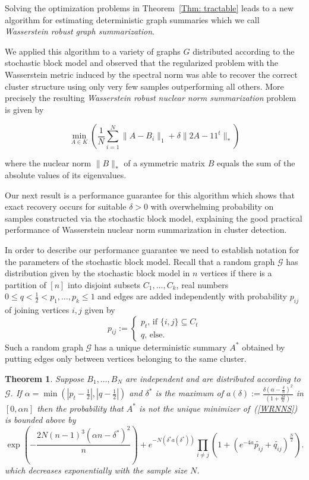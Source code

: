 \documentclass[12pt]{amsart}
\newtheorem{theorem}[lemma]{Theorem}
\theoremstyle{remark}
\newcommand{\grG}{{\mathcal{G}}}
\begin{document}
Solving the optimization problems in Theorem~\ref{Thm: tractable} leads to a new algorithm for estimating deterministic graph summaries which we call {\it Wasserstein robust graph summarization}. 

We applied this algorithm to a variety of graphs $G$ distributed according to the stochastic block model and observed that the regularized problem with the Wasserstein metric induced by the spectral norm was able to recover the correct cluster structure using only very few samples outperforming all others. More precisely the resulting {\it Wasserstein robust nuclear norm summarization} problem is given by

\begin{equation}\label{WRNNS}
\min_{A\in K} \left(\frac{1}{N}\sum_{i=1}^N\|A-B_i\|_1+ \delta\|2A-11^t\|_*\right) 
\end{equation}

where the nuclear norm $\|B\|_*$ of a symmetric matrix $B$ equals the sum of the absolute values of its eigenvalues.

Our next result is a performance guarantee for this algorithm which shows that exact recovery occurs for suitable $\delta>0$ with overwhelming probability on samples constructed via the stochastic block model, explaining the good practical performance of Wasserstein nuclear norm summarization in cluster detection.

In order to describe our performance guarantee we need to establish notation for the parameters of the stochastic block model. Recall that a random graph $\grG$ has distribution given by the stochastic block model in $n$ vertices if there is a partition of $[n]$ into disjoint subsets $C_1,\dots, C_k$, real numbers $0\leq q<\frac{1}{2}<p_1,\dots, p_k\leq 1$ and edges are added independently with probability $p_{ij}$ of joining vertices $i,j$ given by
\[p_{ij}:=\begin{cases}
p_t\text{, if $\{i,j\}\subseteq C_t$}\\
q\text{, else.}
\end{cases}
\] 
Such a random graph $\grG$ has a unique deterministic summary $A^*$ obtained by putting edges only between vertices belonging to the same cluster.

\begin{theorem} Suppose $B_1,\dots, B_N$ are independent and are distributed according to $\grG$. If $\alpha = \min (|p_t-\frac{1}{2}|, |q-\frac{1}{2}|)$ and $\delta^*$ is the maximum of $a(\delta):=\frac{\delta\left(\alpha-\frac{\delta}{n}\right)^2}{\left(1+\frac{2\delta}{n}\right)}$ in $[0,\alpha n]$ then the probability that $A^*$ is not the unique minimizer of~(\ref{WRNNS}) is bounded above by
\[ \exp\left(-\frac{2N(n-1)^3(\alpha n-\delta^*)^2}{n}\right) + e^{-N\left(\delta^* a(\delta^*)\right)}\prod_{i\neq j}\left(1+ (e^{-4a}\widetilde{p_{ij}}+\widetilde{q_{ij}})^{\frac{N}{2}}\right).\] 
which decreases exponentially with the sample size $N$.
\end{theorem}
\end{document}
